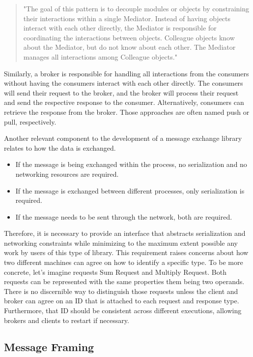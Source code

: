 \documentclass[10pt, conference, a4paper]{IEEEtran}
\begin{document}
\begin{quote}
"The goal of this pattern is to decouple modules or objects by constraining their interactions within a single Mediator. 
Instead of having objects interact with each other directly, the Mediator is responsible for coordinating the interactions between objects. 
Colleague objects know about the Mediator, but do not know about each other. The Mediator manages all interactions among Colleague objects."
\end{quote}\parencite{Mediator}

Similarly, a broker is responsible for handling all interactions from the consumers without having the consumers interact with each other directly.
The consumers will send their request to the broker, and the broker will process their request and send the respective response to the consumer. 
Alternatively, consumers can retrieve the response from the broker. Those approaches are often named push or pull, respectively.

Another relevant component to the development of a message exchange library relates to how the data is exchanged. 

\begin{itemize}
     \item If the message is being exchanged within the process, no serialization and no networking resources are required. 
     \item If the message is exchanged between different processes, only serialization is required.
     \item If the message needs to be sent through the network, both are required. 
\end{itemize}

Therefore, it is necessary to provide an interface that abstracts serialization and networking constraints while minimizing to the maximum extent possible any work by users of this type of library.
This requirement raises concerns about how two different machines can agree on how to identify a specific type. 
To be more concrete, let's imagine requests Sum Request and Multiply Request. Both requests can be represented with the same properties them being two operands. 
There is no discernible way to distinguish those requests unless the client and broker can agree on an ID that is attached to each request and response type. 
Furthermore, that ID should be consistent across different executions, allowing brokers and clients to restart if necessary.

\subsection{Message Framing}
\end{document}
